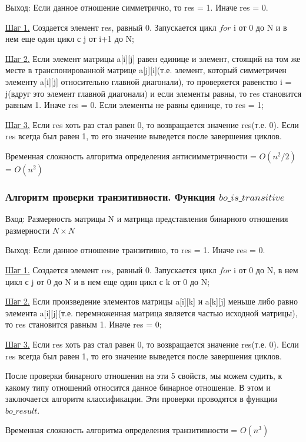 \documentclass[bachelor, och, labwork]{shiza}
\begin{document}
	$\textit{Выход:}$  Если данное отношение симметрично, то res = 1. Иначе res = 0.
	
	\underline{Шаг 1.} Создается элемент res, равный 0. Запускается цикл $for$ i от 0 до N и в нем еще один цикл с j от i+1 до N;
	
	\underline{Шаг 2.} Если элемент матрицы a[i][j] равен единице и элемент, стоящий на том же месте в транспонированной матрице a[j][i](т.е. элемент, который симметричен элементу a[i][j] относительно главной диагонали), то проверяется равенство i = j(вдруг это элемент главной диагонали) и если элементы равны, то res становится равным 1. Иначе res = 0. Если элементы не равны единице, то res = 1;
	
	\underline{Шаг 3.} Если res хоть раз стал равен 0, то возвращается значение res(т.е. 0). Если res всегда был равен 1, то его значение выведется после завершения циклов.
	
	Временная сложность алгоритма определения антисимметричности = $O(n^2/2)$ = $O(n^2)$
	
	\subsubsection{Алгоритм проверки транзитивности. Функция $bo\_is\_transitive$}

	$\textit{Вход:}$ Размерность матрицы N и матрица представления бинарного отношения размерности $N \times N$
	
	$\textit{Выход:}$  Если данное отношение транзитивно, то res = 1. Иначе res = 0.
	
	\underline{Шаг 1.} Создается элемент res, равный 0. Запускается цикл $for$ i от 0 до N, в нем цикл с j от 0 до N и в нем еще один цикл с k от 0 до N;
	
	\underline{Шаг 2.} Если произведение элементов матрицы a[i][k] и a[k][j] меньше либо равно элемента a[i][j](т.е. перемноженная матрица является частью исходной матрицы), то res становится равным 1. Иначе res = 0;
	
	\underline{Шаг 3.} Если res хоть раз стал равен 0, то возвращается значение res(т.е. 0). Если res всегда был равен 1, то его значение выведется после завершения циклов.
	
	После проверки бинарного отношения на эти 5 свойств, мы можем судить, к какому типу отношений относится данное бинарное отношение. В этом  и заключается алгоритм классификации. Эти проверки проводятся в функции $bo\_result$.
	
	Временная сложность алгоритма определения транзитивности = $O(n^3)$
		
\end{document}
